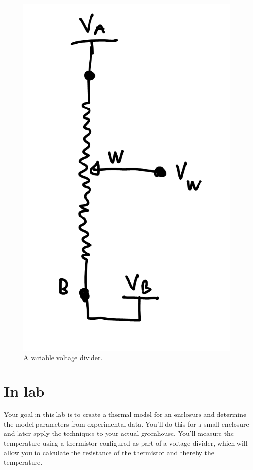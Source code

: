 \documentclass[11pt]{article} %
\begin{document}
\begin{figure}[htbp]
\begin{center}
\includegraphics{figures/var_voltage_divider}
\caption{A variable voltage divider.}
\label{fig:var.vd}
\end{center}
\end{figure}

\section{In lab}

Your goal in this lab is to create a thermal model for an enclosure and determine the model parameters from experimental data. You’ll do this for a small enclosure and later apply the techniques to your actual greenhouse. You’ll measure the temperature using a thermistor configured as part of a voltage divider, which will allow you to calculate the resistance of the thermistor and thereby the temperature.
\end{document}
